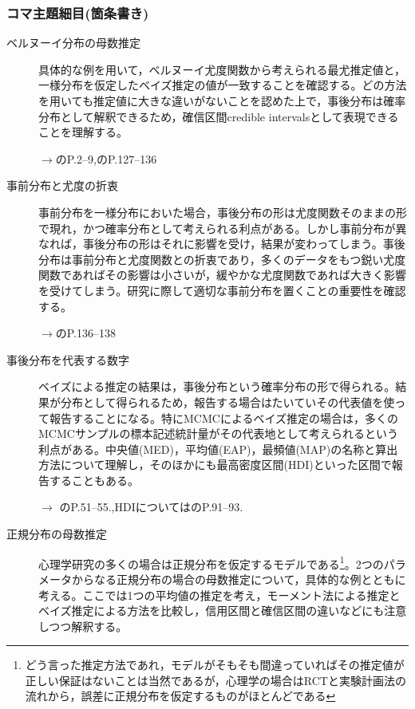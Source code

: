 \subsubsection{コマ主題細目(箇条書き)}
\begin{description}

\item[ベルヌーイ分布の母数推定]具体的な例を用いて，ベルヌーイ尤度関数から考えられる最尤推定値と，一様分布を仮定したベイズ推定の値が一致することを確認する。どの方法を用いても推定値に大きな違いがないことを認めた上で，事後分布は確率分布として解釈できるため，確信区間credible intervalsとして表現できることを理解する。
\begin{flushright}
    $\to$\citet{Lee201709}のP.2--9,\citet{Maeda2017}のP.127--136
\end{flushright}

\item[事前分布と尤度の折衷]事前分布を一様分布においた場合，事後分布の形は尤度関数そのままの形で現れ，かつ確率分布として考えられる利点がある。しかし事前分布が異なれば，事後分布の形はそれに影響を受け，結果が変わってしまう。事後分布は事前分布と尤度関数との折衷であり，多くのデータをもつ鋭い尤度関数であればその影響は小さいが，緩やかな尤度関数であれば大きく影響を受けてしまう。研究に際して適切な事前分布を置くことの重要性を確認する。
\begin{flushright}
    $\to$\citet{Maeda2017}のP.136--138
\end{flushright}

\item[事後分布を代表する数字]ベイズによる推定の結果は，事後分布という確率分布の形で得られる。結果が分布として得られるため，報告する場合はたいていその代表値を使って報告することになる。特にMCMCによるベイズ推定の場合は，多くのMCMCサンプルの標本記述統計量がその代表地として考えられるという利点がある。中央値(MED)，平均値(EAP)，最頻値(MAP)の名称と算出方法について理解し，そのほかにも最高密度区間(HDI)といった区間で報告することもある。
\begin{flushright}
    $\to$ \citet{豊田201506}のP.51--55.,HDIについては\citet{Maeda2017}のP.91--93.
\end{flushright}

\item[正規分布の母数推定]心理学研究の多くの場合は正規分布を仮定するモデルである\footnote{どう言った推定方法であれ，モデルがそもそも間違っていればその推定値が正しい保証はないことは当然であるが，心理学の場合はRCTと実験計画法の流れから，誤差に正規分布を仮定するものがほとんどである}。2つのパラメータからなる正規分布の場合の母数推定について，具体的な例とともに考える。ここでは1つの平均値の推定を考え，モーメント法による推定とベイズ推定による方法を比較し，信用区間と確信区間の違いなどにも注意しつつ解釈する。


\end{description}
